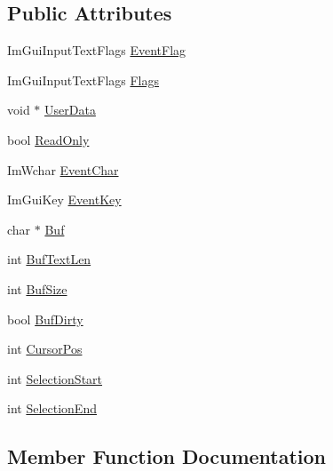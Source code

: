 \subsection*{Public Attributes}
\begin{DoxyCompactItemize}
\item 
Im\+Gui\+Input\+Text\+Flags \hyperlink{struct_im_gui_text_edit_callback_data_aee2fa13574284d68d4025a26d32eba55}{Event\+Flag}
\item 
Im\+Gui\+Input\+Text\+Flags \hyperlink{struct_im_gui_text_edit_callback_data_a6ffea1ffba5aaa267937ea362b844e8c}{Flags}
\item 
void $\ast$ \hyperlink{struct_im_gui_text_edit_callback_data_aaf4994a17aefa6ace9cf8f7c2fa06cf7}{User\+Data}
\item 
bool \hyperlink{struct_im_gui_text_edit_callback_data_a37cec257a392910f386188978027541c}{Read\+Only}
\item 
Im\+Wchar \hyperlink{struct_im_gui_text_edit_callback_data_acda2ae8b38e0596adf2f01036ac06612}{Event\+Char}
\item 
Im\+Gui\+Key \hyperlink{struct_im_gui_text_edit_callback_data_a476e640ad7f2f18ae5518dbc7cc33c55}{Event\+Key}
\item 
char $\ast$ \hyperlink{struct_im_gui_text_edit_callback_data_aecd0741ee3feccbb5482e308292611bc}{Buf}
\item 
int \hyperlink{struct_im_gui_text_edit_callback_data_a98d0d0b8c32d8466ba2f07b7daee9c08}{Buf\+Text\+Len}
\item 
int \hyperlink{struct_im_gui_text_edit_callback_data_ae22679499dd9df688f4fabf1b9e8d048}{Buf\+Size}
\item 
bool \hyperlink{struct_im_gui_text_edit_callback_data_a1ba304d589e00bece6400d43451d864e}{Buf\+Dirty}
\item 
int \hyperlink{struct_im_gui_text_edit_callback_data_aded0e6e87c2dcb66546ae6298e5a8a01}{Cursor\+Pos}
\item 
int \hyperlink{struct_im_gui_text_edit_callback_data_a1634bec3717f7e386033051cf604efed}{Selection\+Start}
\item 
int \hyperlink{struct_im_gui_text_edit_callback_data_af3371b7f36bd6c2b528b033bdb1785a2}{Selection\+End}
\end{DoxyCompactItemize}


\subsection{Member Function Documentation}
\hypertarget{struct_im_gui_text_edit_callback_data_aaa702107677f7da0e7ea61311ab69af0}{}\label{struct_im_gui_text_edit_callback_data_aaa702107677f7da0e7ea61311ab69af0} 
